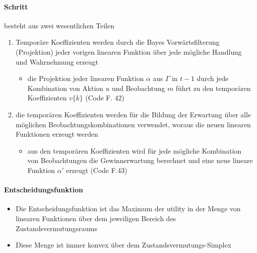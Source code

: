 \paragraph{Schritt} besteht aus zwei wesentlichen Teilen
\begin{enumerate}
	\item Tempor\"are Koeffizienten werden durch die Bayes Vorw\"artsfilterung (Projektion) jeder vorigen linearen Funktion \"uber jede m\"ogliche Handlung und Wahrnehmung erzeugt
	\begin{itemize}
		\item die Projektion jeder linearen Funktion $\alpha$ aus $\Gamma$ in $t-1$ durch jede Kombination von Aktion $u$ und Beobachtung $m$ f\"uhrt zu den tempor\"aren Koeffizienten $v\{ k \}$ (Code F. 42)
	\end{itemize}
	\item die tempor\"aren Koeffizienten werden f\"ur die Bildung der Erwartung \"uber alle m\"oglichen Beobachtungskombinationen verwendet, woraus die neuen linearen Funktionen erzeugt werden
	\begin{itemize}
		\item aus den tempor\"aren Koeffizienten wird f\"ur jede m\"ogliche Kombination von Beobachtungen die Gewinnerwartung berechnet und eine neue lineare Funktion $\alpha'$ erzeugt (Code F.43)
	\end{itemize}
\end{enumerate}

\paragraph{Entscheidungsfunktion}
\begin{itemize}
	\item Die Entscheidungsfunktion ist das Maximum der utility in der Menge von linearen Funktionen \"uber dem jeweiligen Bereich des Zustandsvermutungsraums
	\item Diese Menge ist immer konvex \"uber dem Zustandsvermutungs-Simplex
\end{itemize}

